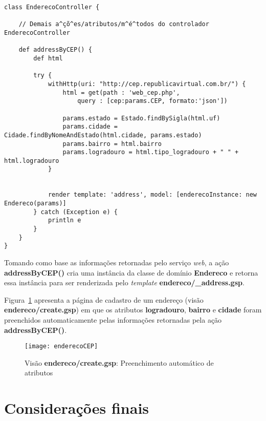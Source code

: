 \begin{lstlisting}[caption=Controlador  {\bf EnderecoController}, frame  = trBL,
    float=htbp, label=codEnderecoController] 
class EnderecoController {

    // Demais a^çõ^es/atributos/m^é^todos do controlador EnderecoController

    def addressByCEP() {
        def html
        
        try {
            withHttp(uri: "http://cep.republicavirtual.com.br/") {
                html = get(path : 'web_cep.php', 
                    query : [cep:params.CEP, formato:'json'])
            
                params.estado = Estado.findBySigla(html.uf)
                params.cidade = Cidade.findByNomeAndEstado(html.cidade, params.estado)
                params.bairro = html.bairro
                params.logradouro = html.tipo_logradouro + " " + html.logradouro
            }
        
               
            render template: 'address', model: [enderecoInstance: new Endereco(params)]
        } catch (Exception e) {
            println e
        }
    }
}
\end{lstlisting}

\vspace{0.3cm}

Tomando como base as informações retornadas  pelo serviço {\it web}, a ação {\bf
  addressByCEP()}  cria uma  instância da  classe  de domínio  {\bf Endereco}  e
retorna  essa   instância  para  ser   renderizada  pelo  {\it   template}  {\bf
  endereco/\_address.gsp}.

\newpage

Figura~\ref{figEnderecoCEP} apresenta a página de cadastro de um endereço (visão
{\bf endereco/create.gsp}) em que os  atributos {\bf logradouro}, {\bf bairro} e
{\bf cidade} foram preenchidos automaticamente pelas informações retornadas pela
ação {\bf addressByCEP()}.  

\vspace{0.3cm}

\begin{figure}[htbp]
\centering\texttt{[image: enderecoCEP]}
\caption{Visão {\bf endereco/create.gsp}: Preenchimento automático de atributos}
\label{figEnderecoCEP}
\end{figure}

\section{Considerações finais}

